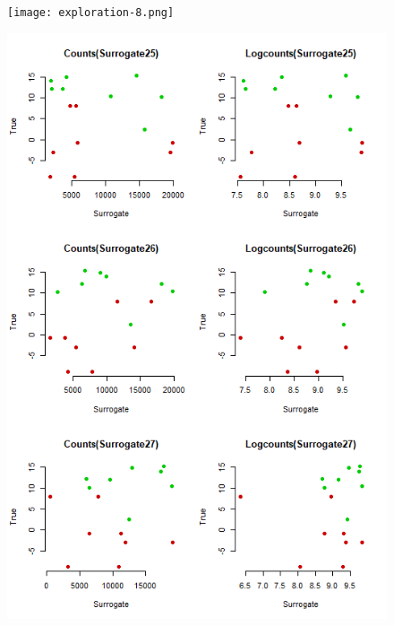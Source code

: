 \documentclass[a4paper,12pt]{article}
\begin{document}
	\begin{figure}[H]
		\begin{minipage}{0.5\textwidth}
			\texttt{[image: exploration-8.png]}
		\end{minipage}
		\begin{minipage}{0.5\textwidth}
			\includegraphics[scale=0.35]{exploration-9.png}
		\end{minipage}
	\end{figure}
	
\end{document}
